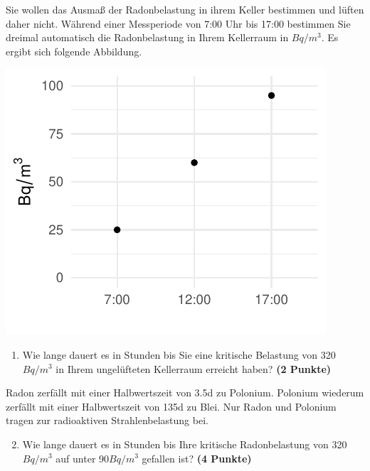 \documentclass[a4paper, 10pt]{scrartcl}\usepackage[]{graphicx}\usepackage[]{xcolor}
\makeatletter
\def\maxwidth{ %
  \ifdim\Gin@nat@width>\linewidth
    \linewidth
  \else
    \Gin@nat@width
  \fi
}
\newenvironment{knitrout}{}{} %
\makeatother
\begin{document}
Sie wollen das Ausma{\ss} der Radonbelastung in ihrem Keller bestimmen und
l{\"u}ften daher nicht. W{\"a}hrend einer Messperiode von 7:00 Uhr bis
17:00 bestimmen Sie dreimal automatisch die Radonbelastung in
Ihrem Kellerraum in $Bq/m^3$. Es ergibt sich folgende Abbildung.

\begin{knitrout}
\color{fgcolor}

{\centering \includegraphics[width=\maxwidth]{img/math-10-1} 

}


\end{knitrout}

\vspace{-0.75cm}

\begin{enumerate}
\item Wie lange dauert es in Stunden bis Sie eine kritische Belastung von
  320$Bq/m^3$ in Ihrem ungel{\"u}fteten Kellerraum erreicht haben?
  \textbf{(2 Punkte)}
\end{enumerate}

Radon zerf{\"a}llt mit einer Halbwertszeit von 3.5d zu
Polonium. Polonium wiederum zerf{\"a}llt mit einer Halbwertszeit von
135d zu Blei. Nur Radon und Polonium tragen zur
radioaktiven Strahlenbelastung bei.

\begin{enumerate}
  \setcounter{enumi}{1}
\item Wie lange dauert es in Stunden bis Ihre kritische Radonbelastung von
  320$Bq/m^3$ auf unter 90$Bq/m^3$ gefallen ist?
  \textbf{(4 Punkte)}
\end{enumerate}
\end{document}
